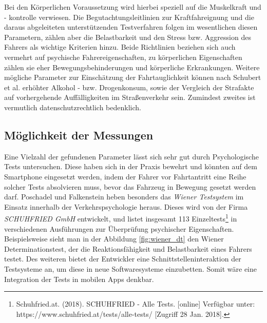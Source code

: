 Bei den Körperlichen Voraussetzung wird hierbei speziell auf die Muskelkraft und - kontrolle verwiesen. Die Begutachtungsleitlinien zur Kraftfahreignung \cite{begutachtungsrichtlinien} und die daraus abgeleiteten unterstützenden Testverfahren \cite{testverfahrenpsychometrischefahreignung} folgen im wesentlichen diesen Parametern, zählen aber die Belastbarkeit und den Stress bzw. Aggression des Fahrers als wichtige Kriterien hinzu. Beide Richtlinien beziehen sich auch vermehrt auf psychische Fahrereigenschaften, zu körperlichen Eigenschaften zählen sie eher Bewegungsbehinderungen und körperliche Erkrankungen. Weitere mögliche Parameter zur Einschätzung der Fahrtauglichkeit können nach Schubert et al. \cite{beurteilungskriterien} erhöhter Alkohol - bzw. Drogenkonsum, sowie der Vergleich der Strafakte auf vorhergehende Auffälligkeiten im Straßenverkehr sein. Zumindest zweites ist vermutlich datenschutzrechtlich bedenklich.

\subsection{Möglichkeit der Messungen}
Eine Vielzahl der gefundenen Parameter lässt sich sehr gut durch Psychologische Tests untersuchen. Diese haben sich in der Praxis bewehrt und könnten auf dem Smartphone eingesetzt werden, indem der Fahrer vor Fahrtantritt eine Reihe solcher Tests absolvieren muss, bevor das Fahrzeug in Bewegung gesetzt werden darf. Poschadel und Falkenstein \cite{testverfahrenpsychometrischefahreignung} heben besonders das \textit{Wiener Testsystem} im Einsatz innerhalb der Verkehrspsychologie heraus. Dieses wird von der Firma \textit{SCHUHFRIED GmbH} entwickelt, und listet insgesamt 113 Einzeltests\footnote{\label{foot:schuhfriedtests} Schuhfried.at. (2018). SCHUHFRIED - Alle Tests. [online] Verfügbar unter: https://www.schuhfried.at/tests/alle-tests/ [Zugriff 28 Jan. 2018].} in verschiedenen Ausführungen zur Überprüfung psychischer Eigenschaften. Beispielsweise sieht man in der Abbildung \ref{fig:wiener_dt} den Wiener Determinationstest, der die Reaktionsfähigkeit und  Belastbarkeit eines Fahrers testet. Des weiteren bietet der Entwickler eine Schnittstelleninteraktion der Testsysteme an, um diese in neue Softwaresysteme einzubetten. Somit wäre eine Integration der Tests in mobilen Apps denkbar.

